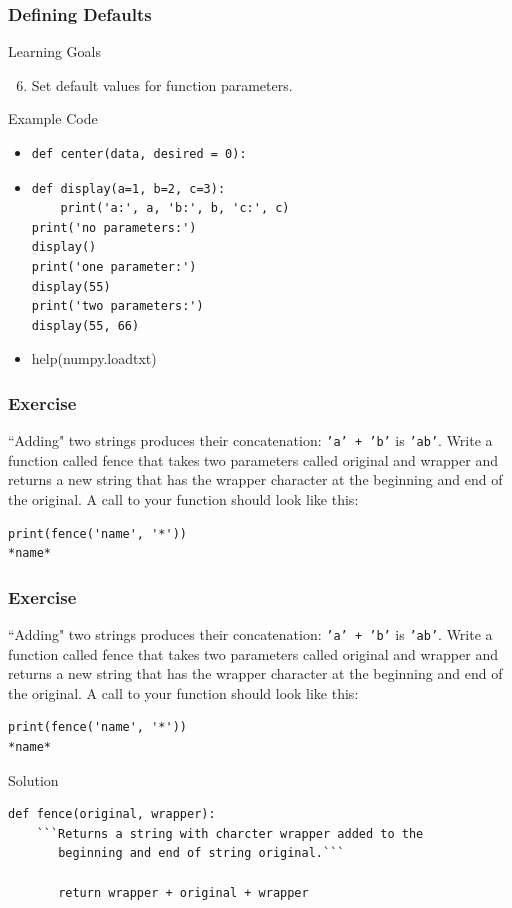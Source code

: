 \documentclass{beamer}
\begin{document}
\begin{frame}[fragile]
\frametitle{Defining Defaults}
\begin{block}{Learning Goals}
\begin{enumerate}
\setcounter{enumi}{5}
\item Set default values for function parameters.
\end{enumerate}
\end{block}
\begin{block}{Example Code}
\begin{itemize}
\item
\begin{verbatim}
def center(data, desired = 0):
\end{verbatim}
\item
\begin{verbatim}
def display(a=1, b=2, c=3):
    print('a:', a, 'b:', b, 'c:', c)
print('no parameters:')
display()
print('one parameter:')
display(55)
print('two parameters:')
display(55, 66)
\end{verbatim}
\item help(numpy.loadtxt)
\end{itemize}
\end{block}
\end{frame}

\begin{frame}[fragile]
\frametitle{Exercise}

``Adding" two strings produces their concatenation: \texttt{'a' + 'b'} is \texttt{'ab'}. Write a function called fence that takes two parameters called original and wrapper and returns a new string that has the wrapper character at the beginning and end of the original. A call to your function should look like this:
\begin{verbatim}
print(fence('name', '*'))
*name*
\end{verbatim}
\end{frame}

\begin{frame}[fragile]
\frametitle{Exercise}

``Adding" two strings produces their concatenation: \texttt{'a' + 'b'} is \texttt{'ab'}. Write a function called fence that takes two parameters called original and wrapper and returns a new string that has the wrapper character at the beginning and end of the original. A call to your function should look like this:
\begin{verbatim}
print(fence('name', '*'))
*name*
\end{verbatim}

\begin{block}{Solution}
\begin{verbatim}
def fence(original, wrapper):
    ```Returns a string with charcter wrapper added to the
       beginning and end of string original.```

       return wrapper + original + wrapper
\end{verbatim}
\end{block}
\end{frame}
\end{document}
